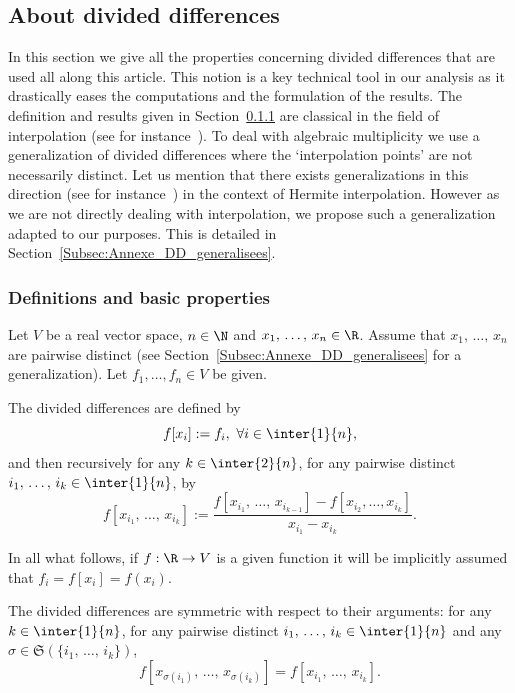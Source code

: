 \subsection{About divided differences} \label{Annexe_DD}


In this section we give all the properties concerning divided differences that are used all along this article. This notion is a key technical tool in our analysis as it drastically eases the computations and the formulation of the results. The definition and results given in Section~\ref{Subsec:Annexe_DD_classique} are classical in the field of interpolation (see for instance~\cite[Chapter 5]{Powell_1981}). To deal with algebraic multiplicity we use a generalization of divided differences where the `interpolation points' are not necessarily distinct. Let us mention that there exists generalizations in this direction (see for instance~\cite[Chapter 5]{Powell_1981}) in the context of Hermite interpolation. However as we are not directly dealing with interpolation, we propose such a generalization adapted to our purposes. This is detailed in Section~\ref{Subsec:Annexe_DD_generalisees}.

\subsubsection{Definitions and basic properties} \label{Subsec:Annexe_DD_classique}

Let $V$ be a real vector space, $n \in \N$ and $x_1,\,\dots,\,x_n \in \R$. Assume that $x_1,\,\dots,\,x_n$ are pairwise distinct (see Section~\ref{Subsec:Annexe_DD_generalisees} for a generalization). Let $f_1,\dotsc,f_n\in V$ be given.

\begin{defi} \label{Def:DifferencesDivisees}
The divided differences are defined by
\[
f[x_i]:=f_i,\ \forall i\in \inter{1}{n},
\]
and then recursively for any $k \in \inter{2}{n}$, for any pairwise distinct $i_1,\,\dots,\, i_k \in \inter{1}{n}$, by
\[
f[x_{i_1},\,\dots,\,x_{i_k}] := \frac{f[x_{i_1},\,\dots,\,x_{i_{k-1}}]-f[x_{i_2}, \dots, x_{i_k}]}{x_{i_1}-x_{i_k}}.
\]
\end{defi}
In all what follows, if $f : \R \to V$ is a given function it will be implicitly assumed that $f_i=f[x_i]=f(x_i)$.


\begin{prop}\label{Prop:DifferencesDiviseesSymetriques}
The divided differences are symmetric with respect to their arguments: for any $k \in \inter{1}{n}$, for any pairwise distinct $i_1,\,\dots,\,i_k \in \inter{1}{n}$ and any $\sigma \in \mathfrak{S}(\{i_1,\,\dotsc,\,i_k\})$,
\[
f[x_{\sigma(i_1)},\,\dots,\,x_{\sigma(i_k)}] = f[x_{i_1},\,\dots,\,x_{i_k}].
\]
\end{prop}

